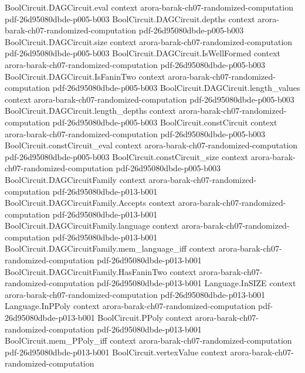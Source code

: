\begin{theorem}
  {BoolCircuit.DAGCircuit.eval}
  {context}
  {arora-barak-ch07-randomized-computation}
  {pdf-26d95080dbde-p005-b003}
\proofstep
  {BoolCircuit.DAGCircuit.depths}
  {context}
  {arora-barak-ch07-randomized-computation}
  {pdf-26d95080dbde-p005-b003}
\proofstep
  {BoolCircuit.DAGCircuit.size}
  {context}
  {arora-barak-ch07-randomized-computation}
  {pdf-26d95080dbde-p005-b003}
\proofstep
  {BoolCircuit.DAGCircuit.IsWellFormed}
  {context}
  {arora-barak-ch07-randomized-computation}
  {pdf-26d95080dbde-p005-b003}
\proofstep
  {BoolCircuit.DAGCircuit.IsFaninTwo}
  {context}
  {arora-barak-ch07-randomized-computation}
  {pdf-26d95080dbde-p005-b003}
\proofstep
  {BoolCircuit.DAGCircuit.length_values}
  {context}
  {arora-barak-ch07-randomized-computation}
  {pdf-26d95080dbde-p005-b003}
\proofstep
  {BoolCircuit.DAGCircuit.length_depths}
  {context}
  {arora-barak-ch07-randomized-computation}
  {pdf-26d95080dbde-p005-b003}
\proofstep
  {BoolCircuit.constCircuit}
  {context}
  {arora-barak-ch07-randomized-computation}
  {pdf-26d95080dbde-p005-b003}
\proofstep
  {BoolCircuit.constCircuit_eval}
  {context}
  {arora-barak-ch07-randomized-computation}
  {pdf-26d95080dbde-p005-b003}
\proofstep
  {BoolCircuit.constCircuit_size}
  {context}
  {arora-barak-ch07-randomized-computation}
  {pdf-26d95080dbde-p005-b003}
\proofstep
  {BoolCircuit.DAGCircuitFamily}
  {context}
  {arora-barak-ch07-randomized-computation}
  {pdf-26d95080dbde-p013-b001}
\proofstep
  {BoolCircuit.DAGCircuitFamily.Accepts}
  {context}
  {arora-barak-ch07-randomized-computation}
  {pdf-26d95080dbde-p013-b001}
\proofstep
  {BoolCircuit.DAGCircuitFamily.language}
  {context}
  {arora-barak-ch07-randomized-computation}
  {pdf-26d95080dbde-p013-b001}
\proofstep
  {BoolCircuit.DAGCircuitFamily.mem_language_iff}
  {context}
  {arora-barak-ch07-randomized-computation}
  {pdf-26d95080dbde-p013-b001}
\proofstep
  {BoolCircuit.DAGCircuitFamily.HasFaninTwo}
  {context}
  {arora-barak-ch07-randomized-computation}
  {pdf-26d95080dbde-p013-b001}
\proofstep
  {Language.InSIZE}
  {context}
  {arora-barak-ch07-randomized-computation}
  {pdf-26d95080dbde-p013-b001}
\proofstep
  {Language.InPPoly}
  {context}
  {arora-barak-ch07-randomized-computation}
  {pdf-26d95080dbde-p013-b001}
\proofstep
  {BoolCircuit.PPoly}
  {context}
  {arora-barak-ch07-randomized-computation}
  {pdf-26d95080dbde-p013-b001}
\proofstep
  {BoolCircuit.mem_PPoly_iff}
  {context}
  {arora-barak-ch07-randomized-computation}
  {pdf-26d95080dbde-p013-b001}
\proofstep
  {BoolCircuit.vertexValue}
  {context}
  {arora-barak-ch07-randomized-computation}

\end{theorem}
